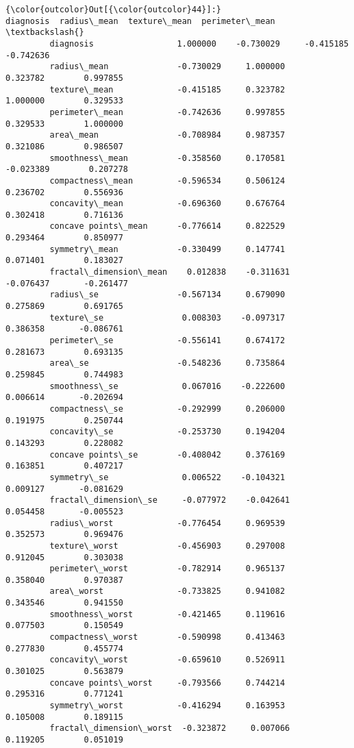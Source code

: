 \documentclass[11pt]{article}
\begin{document}
\begin{Verbatim}[commandchars=\\\{\}]
{\color{outcolor}Out[{\color{outcolor}44}]:}                          diagnosis  radius\_mean  texture\_mean  perimeter\_mean  \textbackslash{}
         diagnosis                 1.000000    -0.730029     -0.415185       -0.742636   
         radius\_mean              -0.730029     1.000000      0.323782        0.997855   
         texture\_mean             -0.415185     0.323782      1.000000        0.329533   
         perimeter\_mean           -0.742636     0.997855      0.329533        1.000000   
         area\_mean                -0.708984     0.987357      0.321086        0.986507   
         smoothness\_mean          -0.358560     0.170581     -0.023389        0.207278   
         compactness\_mean         -0.596534     0.506124      0.236702        0.556936   
         concavity\_mean           -0.696360     0.676764      0.302418        0.716136   
         concave points\_mean      -0.776614     0.822529      0.293464        0.850977   
         symmetry\_mean            -0.330499     0.147741      0.071401        0.183027   
         fractal\_dimension\_mean    0.012838    -0.311631     -0.076437       -0.261477   
         radius\_se                -0.567134     0.679090      0.275869        0.691765   
         texture\_se                0.008303    -0.097317      0.386358       -0.086761   
         perimeter\_se             -0.556141     0.674172      0.281673        0.693135   
         area\_se                  -0.548236     0.735864      0.259845        0.744983   
         smoothness\_se             0.067016    -0.222600      0.006614       -0.202694   
         compactness\_se           -0.292999     0.206000      0.191975        0.250744   
         concavity\_se             -0.253730     0.194204      0.143293        0.228082   
         concave points\_se        -0.408042     0.376169      0.163851        0.407217   
         symmetry\_se               0.006522    -0.104321      0.009127       -0.081629   
         fractal\_dimension\_se     -0.077972    -0.042641      0.054458       -0.005523   
         radius\_worst             -0.776454     0.969539      0.352573        0.969476   
         texture\_worst            -0.456903     0.297008      0.912045        0.303038   
         perimeter\_worst          -0.782914     0.965137      0.358040        0.970387   
         area\_worst               -0.733825     0.941082      0.343546        0.941550   
         smoothness\_worst         -0.421465     0.119616      0.077503        0.150549   
         compactness\_worst        -0.590998     0.413463      0.277830        0.455774   
         concavity\_worst          -0.659610     0.526911      0.301025        0.563879   
         concave points\_worst     -0.793566     0.744214      0.295316        0.771241   
         symmetry\_worst           -0.416294     0.163953      0.105008        0.189115   
         fractal\_dimension\_worst  -0.323872     0.007066      0.119205        0.051019   
         

\end{Verbatim}
\end{document}

